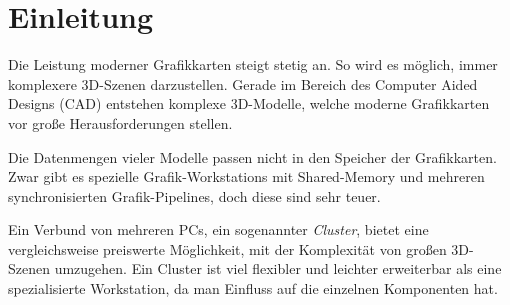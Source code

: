 %
%
%
%
%
%
%
%
%

\chapter{Einleitung}
%
%

Die Leistung moderner Grafikkarten steigt stetig an. So wird es möglich, immer komplexere 3D-Szenen darzustellen. Gerade im Bereich des Computer Aided Designs (CAD) entstehen komplexe 3D-Modelle, welche moderne Grafikkarten vor große Herausforderungen stellen. 

Die Datenmengen vieler Modelle passen nicht in den Speicher der Grafikkarten. Zwar gibt es spezielle Grafik-Workstations mit Shared-Memory und mehreren synchronisierten Grafik-Pipelines, doch diese sind sehr teuer. 

Ein Verbund von mehreren PCs, ein sogenannter \emph{Cluster}, bietet eine vergleichsweise preiswerte Möglichkeit, mit der Komplexität von großen 3D-Szenen umzugehen. Ein Cluster ist viel flexibler und leichter erweiterbar als eine spezialisierte Workstation, da man Einfluss auf die einzelnen Komponenten hat.


